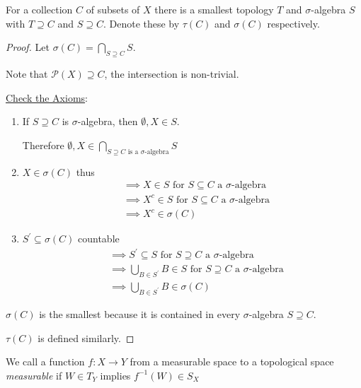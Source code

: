 \begin{theorem}
	For a collection $C$ of subsets of $X$ there is a smallest topology $T$ and $\sigma$-algebra $S$ with $T \supseteq C$ and $S \supseteq C$.
	Denote these by $\tau(C)$ and $\sigma(C)$ respectively.
\end{theorem}

\begin{proof}
	Let $\sigma(C) = \bigcap\limits_{S \supseteq C} S$.

	Note that $\mathcal{P}(X) \supseteq C$, the intersection is non-trivial.

	\underline{Check the Axioms}:
	\begin{enumerate}
		\item If $S \supseteq C$ is $\sigma$-algebra, then $\emptyset,X \in S$.

			Therefore  $\emptyset, X \in \bigcap \limits_{S \supseteq C \text{ is a $\sigma$-algebra}}S $
		\item $X \in \sigma(C)$ thus
			 \begin{align*}
			&\implies X \in S \text{ for } S \subseteq C \text{ a } \sigma\text{-algebra} \\
			&\implies X^{c} \in S \text{ for } S \subseteq C \text{ a } \sigma\text{-algebra} \\
			&\implies X^{c} \in \sigma(C)
			\end{align*} 

	\item $S^{'} \subseteq \sigma (C)$ countable
		 \begin{align*}
		&\implies S^{'} \subseteq S \text{ for } S \supseteq C \text{ a $\sigma$-algebra} \\
		&\implies \bigcup_{B \in S^{'}} B \in S \text{ for } S \supseteq C \text{ a $\sigma$-algebra} \\
		&\implies \bigcup_{B \in S^{'}} B \in \sigma(C)
		\end{align*} 
	\end{enumerate}

	$\sigma(C)$ is the smallest because it is contained in every $\sigma$-algebra $S \supseteq C$.

	 $\tau(C)$ is defined similarly.
\end{proof}

\begin{definition}
	We call a function $f:X \to Y$ from a measurable space to a topological space \textit{measurable} if $W \in T_Y$ implies $f^{-1}(W) \in S_X$
\end{definition}

